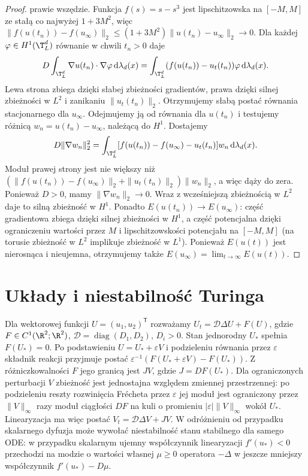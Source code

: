 \begin{proof}
prawie wszędzie. Funkcja $f(s)=s-s^3$ jest
lipschitzowska na $[-M,M]$ ze stałą co najwyżej
$1+3M^2$, więc
$\|f(u(t_n))-f(u_\infty)\|_2
\le(1+3M^2)\|u(t_n)-u_\infty\|_2\to0$.
Dla każdej $\varphi\in H^1(\T_L^d)$ równanie
w chwili $t_n>0$ daje
\[
 D\int_{\T_L^d}\nabla u(t_n)\cdot\nabla\varphi\,
                         \mathrm d\lambda_d(x)
 =\int_{\T_L^d}(f(u(t_n))-u_t(t_n))\varphi\,
                         \mathrm d\lambda_d(x).
\]
Lewa strona zbiega dzięki słabej zbieżności
gradientów, prawa dzięki silnej zbieżności w $L^2$
i zanikaniu $\|u_t(t_n)\|_2$.
Otrzymujemy słabą postać równania stacjonarnego
dla $u_\infty$. Odejmujemy ją od równania dla
$u(t_n)$ i testujemy różnicą $w_n=u(t_n)-u_\infty$,
należącą do $H^1$. Dostajemy
\[
 D\|\nabla w_n\|_2^2
 =\int_{\T_L^d}
 [f(u(t_n))-f(u_\infty)-u_t(t_n)]w_n\,
 \mathrm d\lambda_d(x).
\]
Moduł prawej strony jest nie większy niż
$(\|f(u(t_n))-f(u_\infty)\|_2+\|u_t(t_n)\|_2)
\|w_n\|_2$, a więc dąży do zera. Ponieważ $D>0$,
mamy $\|\nabla w_n\|_2\to0$. Wraz z wcześniejszą
zbieżnością w $L^2$ daje to silną zbieżność w $H^1$.
Ponadto $E(u(t_n))\to E(u_\infty)$:
część gradientowa zbiega dzięki silnej zbieżności
w $H^1$, a część potencjalna dzięki ograniczeniu
wartości przez $M$ i lipschitzowskości potencjału
na $[-M,M]$ (na torusie zbieżność w $L^2$
implikuje zbieżność w $L^1$).
Ponieważ $E(u(t))$ jest nierosnąca i nieujemna,
otrzymujemy także $E(u_\infty)=\lim_{t\to\infty}E(u(t))$.
\end{proof}

\section{Układy i niestabilność Turinga}
Dla wektorowej funkcji $U=(u_1,u_2)^{\mathsf T}$
rozważamy $U_t=\mathcal D\Delta U+F(U)$,
gdzie $F\in C^1(\R^2;\R^2)$,
$\mathcal D=\operatorname{diag}(D_1,D_2)$, $D_i>0$.
Stan jednorodny $U_*$ spełnia $F(U_*)=0$.
Po podstawieniu $U=U_*+\varepsilon V$
i podzieleniu równania przez $\varepsilon$
składnik reakcji przyjmuje postać
$\varepsilon^{-1}(F(U_*+\varepsilon V)-F(U_*))$.
Z różniczkowalności $F$ jego granicą jest $JV$,
gdzie $J=DF(U_*)$. Dla ograniczonych perturbacji
$V$ zbieżność jest jednostajna względem zmiennej
przestrzennej: po podzieleniu reszty rozwinięcia
Frécheta przez $\varepsilon$ jej moduł jest ograniczony
przez $\|V\|_\infty$ razy moduł ciągłości $DF$
na kuli o promieniu $|\varepsilon|\|V\|_\infty$
wokół $U_*$. Linearyzacja ma więc postać
$V_t=\mathcal D\Delta V+JV$.
W odróżnieniu od przypadku skalarnego dyfuzja może
wywołać niestabilność stanu stabilnego dla samego ODE:
w przypadku skalarnym ujemny współczynnik linearyzacji
$f'(u_*)<0$ przechodzi na modzie o wartości własnej
$\mu\ge0$ operatora $-\Delta$ w jeszcze mniejszy
współczynnik $f'(u_*)-D\mu$.


